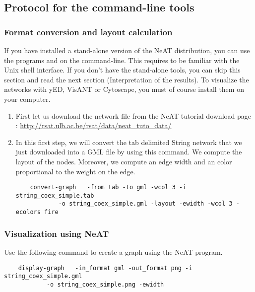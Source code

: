 \subsection{Protocol for the command-line tools}
\subsubsection{Format conversion and layout calculation}
If you have installed a stand-alone version of the NeAT distribution,
you can use the programs  and  on the
command-line. This requires to be familiar with the Unix shell
interface. If you don't have the stand-alone tools, you can skip this
section and read the next section (Interpretation of the results). To visualize the networks with yED, VisANT or Cytoscape, you
must of course install them on your computer.


\begin{enumerate}
\item First let us download the network file  from the NeAT tutorial download page : \url{http://rsat.ulb.ac.be/rsat/data/neat\_tuto\_data/} 
\item In this first step, we will convert the tab delimited String network that we just downloaded into a GML file by using this command. We compute the layout of the nodes. Moreover, we compute an edge width and an color proportional to the weight on the edge.
	{\color{Blue} \begin{footnotesize} 
		\begin{verbatim}
	convert-graph 	-from tab -to gml -wcol 3 -i string_coex_simple.tab 
			-o string_coex_simple.gml -layout -ewidth -wcol 3 -ecolors fire
		\end{verbatim} \end{footnotesize}
	}	

\end{enumerate}


\subsubsection{Visualization using NeAT}
Use the following command to create a graph using the NeAT  program.
	{\color{Blue} \begin{footnotesize} 
		\begin{verbatim}
	display-graph 	-in_format gml -out_format png -i string_coex_simple.gml
			-o string_coex_simple.png -ewidth
		\end{verbatim} \end{footnotesize}
	}


